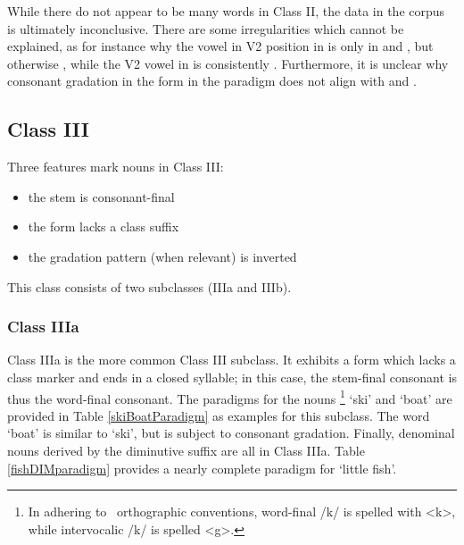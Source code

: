 While there do not appear to be many words in Class II, the data in the corpus is ultimately inconclusive. %
There are some irregularities which cannot be explained, as for instance 
why the vowel in V2 position in  is only  in  and , but otherwise , while the V2 vowel in  is consistently . Furthermore, it is unclear why consonant gradation in the  form in the  paradigm does not align with  and . %


\FloatBarrier


\subsection{Class III}\label{NclassIII}
Three features mark nouns in Class III: 
\begin{itemize}
\item{the stem is consonant-final}
\item{the  form lacks a class suffix}
\item{the gradation pattern (when relevant) is inverted}
\end{itemize}
This class consists of two subclasses (IIIa and IIIb). 


\subsubsection{Class IIIa}\label{NclassIIIa}
Class IIIa is the more common Class III subclass. It exhibits a  form which lacks a class marker and ends in a closed syllable; in this case, the stem-final consonant is thus the word-final consonant. 
The paradigms for the nouns \footnote{In adhering to \PS\ orthographic conventions, word-final /k/ is spelled with <k>, while intervocalic /k/ is spelled <g>.} 
‘ski’ and  ‘boat’ are provided in Table \vref{skiBoatParadigm} %
as examples for this subclass. %
The word  ‘boat’ is similar to  ‘ski’, but is subject to consonant gradation. %
Finally, denominal nouns derived by the diminutive suffix  are all in Class IIIa. Table \vref{fishDIMparadigm} provides a nearly complete paradigm for  ‘little fish’. 

